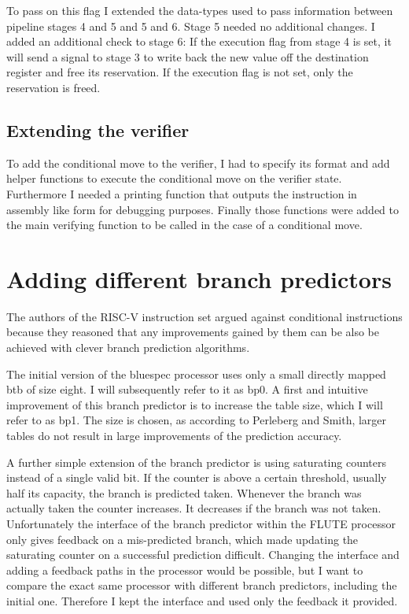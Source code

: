 \documentclass[12pt,twoside,notitlepage]{report}
\begin{document}
To pass on this flag I extended the data-types used to pass information between pipeline stages 4 and 5 and 5 and 6. Stage 5 needed no additional changes. I added an additional check to stage 6: If the execution flag from stage 4 is set, it will send a signal to stage 3 to write back the new value off the destination register and free its reservation. If the execution flag is not set, only the reservation is freed.

\subsection{Extending the verifier}

To add the conditional move to the verifier, I had to specify its format and add helper functions to execute the conditional move on the verifier state. Furthermore I needed a printing function that outputs the instruction in assembly like form for debugging purposes. Finally those functions were added to the main verifying function to be called in the case of a conditional move.

\section{Adding different branch predictors}

The authors of the RISC-V instruction set argued against conditional instructions because they reasoned that any improvements gained by them can be also be achieved with clever branch prediction algorithms.

The initial version of the bluespec processor uses only a small directly mapped \gls{btb} of size eight. I will subsequently refer to it as \gls{bp0}. A first and intuitive improvement of this branch predictor is to increase the table size, which I will refer to as \gls{bp1}. The size is chosen, as according to Perleberg and Smith\cite{perleberg1993branch}, larger tables do not result in large improvements of the prediction accuracy.

A further simple extension of the branch predictor is using saturating counters instead of a single valid bit. If the counter is above a certain threshold, usually half its capacity, the branch is predicted taken. Whenever the branch was actually taken the counter increases. It decreases if the branch was not taken. Unfortunately the interface of the branch predictor within the FLUTE processor only gives feedback on a mis-predicted branch, which made updating the saturating counter on a successful prediction difficult. Changing the interface and adding a feedback paths in the processor would be possible, but I want to compare the exact same processor with different branch predictors, including the initial one. Therefore I kept the interface and used only the feedback it provided.
\end{document}

